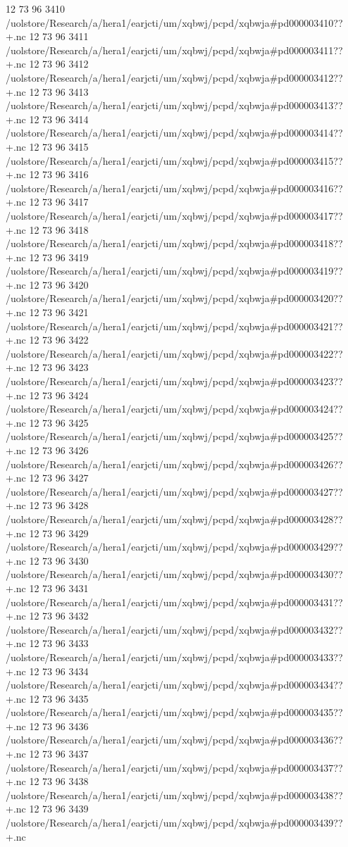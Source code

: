 12 73 96
3410
/uolstore/Research/a/hera1/earjcti/um/xqbwj/pcpd/xqbwja#pd000003410??+.nc
12 73 96
3411
/uolstore/Research/a/hera1/earjcti/um/xqbwj/pcpd/xqbwja#pd000003411??+.nc
12 73 96
3412
/uolstore/Research/a/hera1/earjcti/um/xqbwj/pcpd/xqbwja#pd000003412??+.nc
12 73 96
3413
/uolstore/Research/a/hera1/earjcti/um/xqbwj/pcpd/xqbwja#pd000003413??+.nc
12 73 96
3414
/uolstore/Research/a/hera1/earjcti/um/xqbwj/pcpd/xqbwja#pd000003414??+.nc
12 73 96
3415
/uolstore/Research/a/hera1/earjcti/um/xqbwj/pcpd/xqbwja#pd000003415??+.nc
12 73 96
3416
/uolstore/Research/a/hera1/earjcti/um/xqbwj/pcpd/xqbwja#pd000003416??+.nc
12 73 96
3417
/uolstore/Research/a/hera1/earjcti/um/xqbwj/pcpd/xqbwja#pd000003417??+.nc
12 73 96
3418
/uolstore/Research/a/hera1/earjcti/um/xqbwj/pcpd/xqbwja#pd000003418??+.nc
12 73 96
3419
/uolstore/Research/a/hera1/earjcti/um/xqbwj/pcpd/xqbwja#pd000003419??+.nc
12 73 96
3420
/uolstore/Research/a/hera1/earjcti/um/xqbwj/pcpd/xqbwja#pd000003420??+.nc
12 73 96
3421
/uolstore/Research/a/hera1/earjcti/um/xqbwj/pcpd/xqbwja#pd000003421??+.nc
12 73 96
3422
/uolstore/Research/a/hera1/earjcti/um/xqbwj/pcpd/xqbwja#pd000003422??+.nc
12 73 96
3423
/uolstore/Research/a/hera1/earjcti/um/xqbwj/pcpd/xqbwja#pd000003423??+.nc
12 73 96
3424
/uolstore/Research/a/hera1/earjcti/um/xqbwj/pcpd/xqbwja#pd000003424??+.nc
12 73 96
3425
/uolstore/Research/a/hera1/earjcti/um/xqbwj/pcpd/xqbwja#pd000003425??+.nc
12 73 96
3426
/uolstore/Research/a/hera1/earjcti/um/xqbwj/pcpd/xqbwja#pd000003426??+.nc
12 73 96
3427
/uolstore/Research/a/hera1/earjcti/um/xqbwj/pcpd/xqbwja#pd000003427??+.nc
12 73 96
3428
/uolstore/Research/a/hera1/earjcti/um/xqbwj/pcpd/xqbwja#pd000003428??+.nc
12 73 96
3429
/uolstore/Research/a/hera1/earjcti/um/xqbwj/pcpd/xqbwja#pd000003429??+.nc
12 73 96
3430
/uolstore/Research/a/hera1/earjcti/um/xqbwj/pcpd/xqbwja#pd000003430??+.nc
12 73 96
3431
/uolstore/Research/a/hera1/earjcti/um/xqbwj/pcpd/xqbwja#pd000003431??+.nc
12 73 96
3432
/uolstore/Research/a/hera1/earjcti/um/xqbwj/pcpd/xqbwja#pd000003432??+.nc
12 73 96
3433
/uolstore/Research/a/hera1/earjcti/um/xqbwj/pcpd/xqbwja#pd000003433??+.nc
12 73 96
3434
/uolstore/Research/a/hera1/earjcti/um/xqbwj/pcpd/xqbwja#pd000003434??+.nc
12 73 96
3435
/uolstore/Research/a/hera1/earjcti/um/xqbwj/pcpd/xqbwja#pd000003435??+.nc
12 73 96
3436
/uolstore/Research/a/hera1/earjcti/um/xqbwj/pcpd/xqbwja#pd000003436??+.nc
12 73 96
3437
/uolstore/Research/a/hera1/earjcti/um/xqbwj/pcpd/xqbwja#pd000003437??+.nc
12 73 96
3438
/uolstore/Research/a/hera1/earjcti/um/xqbwj/pcpd/xqbwja#pd000003438??+.nc
12 73 96
3439
/uolstore/Research/a/hera1/earjcti/um/xqbwj/pcpd/xqbwja#pd000003439??+.nc
